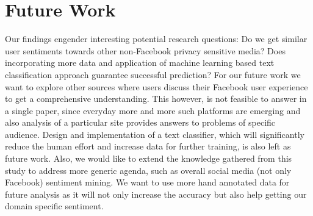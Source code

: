\section{Future Work}
\label{sec:futurework}

Our findings engender interesting potential research questions: Do we get similar user sentiments towards other non-Facebook privacy sensitive media? Does incorporating more data and application of machine learning based text classification approach guarantee successful prediction? For our future work we want to explore other sources where users discuss their Facebook user experience to get a comprehensive understanding. This however, is not feasible to answer in a single paper, since everyday more and more such platforms are emerging and also analysis of a particular site provides answers to problems of specific audience. Design and implementation of a text classifier, which will significantly reduce the human effort and increase data for further training, is also left as future work. Also, we would like to extend the knowledge gathered from this study to address more generic agenda, such as overall social media (not only Facebook) sentiment mining. We want to use more hand annotated data for future analysis as it will not only increase the accuracy but also help getting our domain specific sentiment.